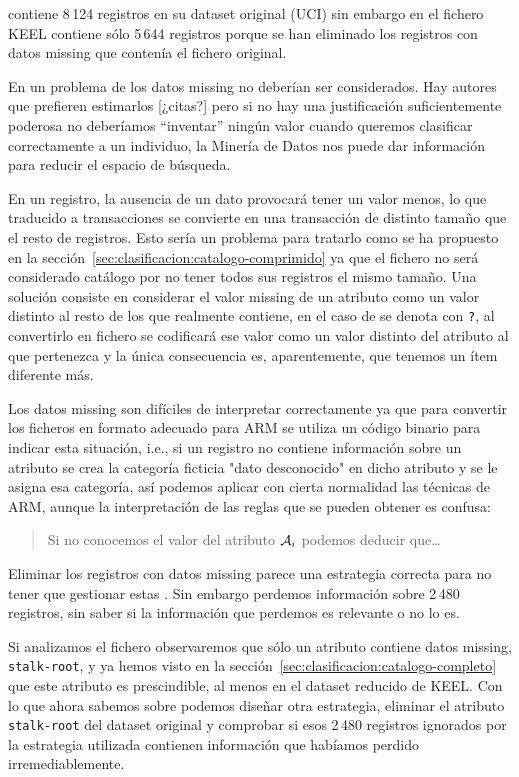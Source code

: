 \ABIERTO
\mushroom contiene 8\,124 registros en su dataset original (UCI) sin embargo en el fichero KEEL contiene sólo 5\,644 registros porque se han eliminado los registros con datos missing que contenía el fichero original.

En un problema de \clasificacion los datos missing no deberían ser considerados. Hay autores que prefieren estimarlos [¿citas?] pero si no hay una justificación suficientemente poderosa no deberíamos ``inventar'' ningún valor cuando queremos clasificar correctamente a un individuo, la Minería de Datos nos puede dar información para reducir el espacio de búsqueda.

En un registro, la ausencia de un dato provocará tener un valor menos, lo que traducido a transacciones se convierte en una transacción de distinto tamaño que el resto de registros. Esto sería un problema para tratarlo como se ha propuesto en la sección~\ref{sec:clasificacion:catalogo-comprimido} ya que el fichero \D no será considerado catálogo por no tener todos sus registros el mismo tamaño. Una solución consiste en considerar el valor missing de un atributo como un valor distinto al resto de los que realmente contiene, en el caso de \mushroom se denota con \texttt{?}, al convertirlo en fichero \D se codificará ese valor como un valor distinto del atributo al que pertenezca y la única consecuencia es, aparentemente, que tenemos un ítem diferente más.

Los datos missing son difíciles de interpretar correctamente ya que para convertir los ficheros en formato adecuado para ARM se utiliza un código binario para indicar esta situación, i.e., si un registro no contiene información sobre un atributo se crea la categoría ficticia "dato desconocido" en dicho atributo y se le asigna esa categoría, así podemos aplicar con cierta normalidad las técnicas de ARM, aunque la interpretación de las reglas que se pueden obtener es confusa:

\begin{quote}
Si no conocemos el valor del atributo $\A_i$ podemos deducir que\ldots
\end{quote}

Eliminar los registros con datos missing parece una estrategia correcta para no tener que gestionar estas \ars. Sin embargo perdemos información sobre 2\,480 registros, sin saber si la información que perdemos es relevante o no lo es.

Si analizamos el fichero \mushroom observaremos que sólo un atributo contiene datos missing, \texttt{stalk-root}, y ya hemos visto en la sección~\ref{sec:clasificacion:catalogo-completo} que este atributo es prescindible, al menos en el dataset reducido de KEEL. Con lo que ahora sabemos sobre \catalogos podemos diseñar otra estrategia, eliminar el atributo \texttt{stalk-root} del dataset original y comprobar si esos 2\,480 registros ignorados por la estrategia utilizada contienen información que habíamos perdido irremediablemente.


